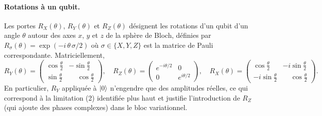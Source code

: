 \documentclass[a4paper]{article}
\begin{document}
\paragraph{Rotations à un qubit.} Les portes $R_X(\theta)$, $R_Y(\theta)$ et $R_Z(\theta)$ désignent les rotations d'un qubit d'un angle $\theta$ autour des axes $x$, $y$ et $z$ de la sphère de Bloch, définies par $R_\sigma(\theta) = \exp(-i\,\theta\,\sigma/2)$ où $\sigma \in \{X, Y, Z\}$ est la matrice de Pauli correspondante. Matriciellement,
\[
R_Y(\theta) = \begin{pmatrix} \cos\tfrac{\theta}{2} & -\sin\tfrac{\theta}{2} \\ \sin\tfrac{\theta}{2} & \phantom{-}\cos\tfrac{\theta}{2} \end{pmatrix}, \quad R_Z(\theta) = \begin{pmatrix} e^{-i\theta/2} & 0 \\ 0 & e^{i\theta/2} \end{pmatrix}, \quad R_X(\theta) = \begin{pmatrix} \cos\tfrac{\theta}{2} & -i\sin\tfrac{\theta}{2} \\ -i\sin\tfrac{\theta}{2} & \phantom{-i}\cos\tfrac{\theta}{2} \end{pmatrix}.
\]
En particulier, $R_Y$ appliquée à $\ket{0}$ n'engendre que des amplitudes réelles, ce qui correspond à la limitation (2) identifiée plus haut et justifie l'introduction de $R_Z$ (qui ajoute des phases complexes) dans le bloc variationnel.
\end{document}
